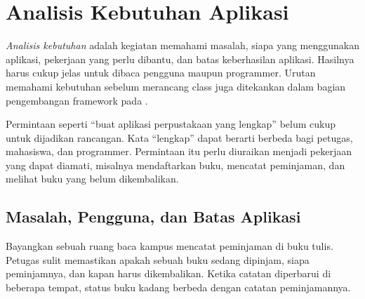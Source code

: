 
\section{Analisis Kebutuhan Aplikasi}

\emph{Analisis kebutuhan} adalah kegiatan memahami masalah, siapa yang menggunakan aplikasi, pekerjaan yang perlu dibantu, dan batas keberhasilan aplikasi. Hasilnya harus cukup jelas untuk dibaca pengguna maupun programmer. Urutan memahami kebutuhan sebelum merancang class juga ditekankan dalam bagian pengembangan framework pada \cite{oopTanpaTahun}.

Permintaan seperti ``buat aplikasi perpustakaan yang lengkap'' belum cukup untuk dijadikan rancangan. Kata ``lengkap'' dapat berarti berbeda bagi petugas, mahasiswa, dan programmer. Permintaan itu perlu diuraikan menjadi pekerjaan yang dapat diamati, misalnya mendaftarkan buku, mencatat peminjaman, dan melihat buku yang belum dikembalikan.

\subsection{Masalah, Pengguna, dan Batas Aplikasi}

Bayangkan sebuah ruang baca kampus mencatat peminjaman di buku tulis. Petugas sulit memastikan apakah sebuah buku sedang dipinjam, siapa peminjamnya, dan kapan harus dikembalikan. Ketika catatan diperbarui di beberapa tempat, status buku kadang berbeda dengan catatan peminjamannya.

